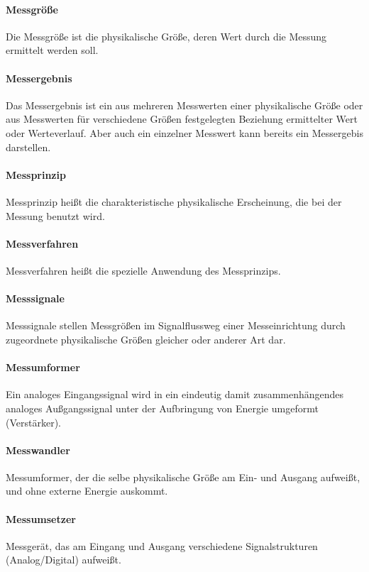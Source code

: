 \paragraph{Messgröße}
Die Messgröße ist die physikalische Größe, deren Wert durch die Messung ermittelt werden soll.

\paragraph{Messergebnis}
Das Messergebnis ist ein aus mehreren Messwerten einer physikalische Größe oder aus Messwerten für verschiedene Größen festgelegten Beziehung ermittelter Wert oder Werteverlauf.
Aber auch ein einzelner Messwert kann bereits ein Messergebis darstellen.

\paragraph{Messprinzip}
Messprinzip heißt die charakteristische physikalische Erscheinung, die bei der Messung benutzt wird.

\paragraph{Messverfahren}
Messverfahren heißt die spezielle Anwendung des Messprinzips.

\paragraph{Messsignale}
Messsignale stellen Messgrößen im Signalflussweg einer Messeinrichtung durch zugeordnete physikalische Größen gleicher oder anderer Art dar.

\paragraph{Messumformer} 
Ein analoges Eingangssignal wird in ein eindeutig damit zusammenhängendes analoges Außgangssignal unter der Aufbringung von Energie umgeformt (Verstärker).

\paragraph{Messwandler}
Messumformer, der die selbe physikalische Größe am Ein- und Ausgang aufweißt, und ohne externe Energie auskommt.

\paragraph{Messumsetzer}
Messgerät, das am Eingang und Ausgang verschiedene Signalstrukturen (Analog/Digital) aufweißt.

